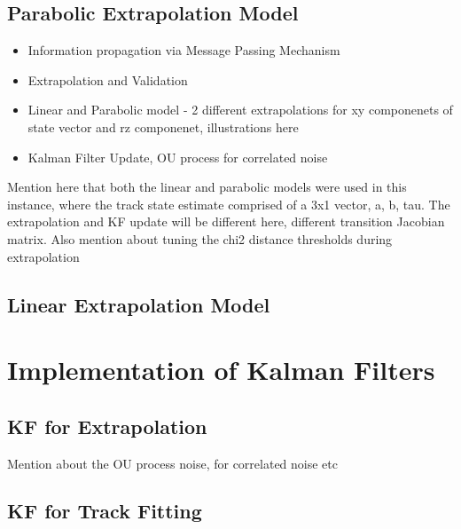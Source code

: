 \subsection{Parabolic Extrapolation Model}
\begin{itemize}
    \item Information propagation via Message Passing Mechanism
    \item Extrapolation and Validation
    \item Linear and Parabolic model - 2 different extrapolations for xy componenets of state vector and rz componenet, illustrations here
    \item Kalman Filter Update, OU process for correlated noise
\end{itemize}

Mention here that both the linear and parabolic models were used in this instance, where the track state estimate comprised of a 3x1 vector, a, b, tau. The extrapolation and KF update will be different here, different transition Jacobian matrix. Also mention about tuning the chi2 distance thresholds during extrapolation


\subsection{Linear Extrapolation Model}


\section{Implementation of Kalman Filters}
\label{gnn-kf-implementation}

\subsection{KF for Extrapolation}
Mention about the OU process noise, for correlated noise etc

\subsection{KF for Track Fitting}


